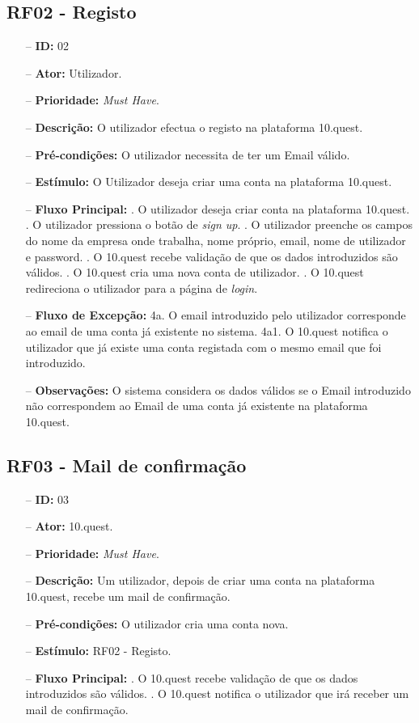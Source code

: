 \subsection{RF02 - Registo}
\begin{itemize}
	\item[--] \textbf{ID:} 02
	\item[--]  \textbf{Ator:} Utilizador.
	\item[--]  \textbf{Prioridade:} \textit{Must Have}.
	\item[--]  \textbf{Descrição:} O utilizador efectua o registo na plataforma 10.quest.
	\item[--]  \textbf{Pré-condições:} O utilizador necessita de ter um Email válido.
	\item[--]  \textbf{Estímulo:} O Utilizador deseja criar uma conta na plataforma 10.quest.
	\item[--]  \textbf{Fluxo Principal:} 
		. O utilizador deseja criar conta na plataforma 10.quest.
		. O utilizador pressiona o botão de \textit{sign up}.
		. O utilizador preenche os campos do nome da empresa onde trabalha, nome próprio, email, nome de utilizador e password.
		. O 10.quest recebe validação de que os dados introduzidos são válidos.
		. O 10.quest cria uma nova conta de utilizador.
		. O 10.quest redireciona o utilizador para a página de \textit{login}.
	\item[--]  \textbf{Fluxo de Excepção:} 
			\subitem 4a. O email introduzido pelo utilizador corresponde ao email de uma conta já existente no sistema.
			\subitem 4a1. O 10.quest notifica o utilizador que já existe uma conta registada com o mesmo email que foi introduzido.
	\item[--]  \textbf{Observações:}  O sistema considera os dados válidos se o Email introduzido não correspondem ao Email de uma conta já existente na plataforma 10.quest.
\end{itemize}
\newpage

\subsection{RF03 - Mail de confirmação}
\begin{itemize}
	\item[--] \textbf{ID:} 03
	\item[--]  \textbf{Ator:} 10.quest.
	\item[--]  \textbf{Prioridade:} \textit{Must Have}.
	\item[--]  \textbf{Descrição:} Um utilizador, depois de criar uma conta na plataforma 10.quest, recebe um mail de confirmação.
	\item[--]  \textbf{Pré-condições:} O utilizador cria uma conta nova.
	\item[--]  \textbf{Estímulo:} RF02 - Registo.
	\item[--]  \textbf{Fluxo Principal:} 
			. O 10.quest recebe validação de que os dados introduzidos são válidos.
			. O 10.quest notifica o utilizador que irá receber um mail de confirmação.
\end{itemize}
\newpage


